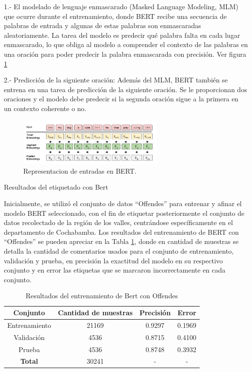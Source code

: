 1.- El modelado de lenguaje enmascarado (Masked Language Modeling, MLM) que ocurre durante el entrenamiento, donde BERT recibe una secuencia de palabras de entrada y algunas de estas palabras son enmascaradas aleatoriamente. La tarea del modelo es predecir qué palabra falta en cada lugar enmascarado, lo que obliga al modelo a comprender el contexto de las palabras en una oración para poder predecir la palabra enmascarada con precisión. Ver figura \ref{fig:nlp8}

2.- Predicción de la siguiente oración: Además del MLM, BERT también se entrena en una tarea de predicción de la siguiente oración. Se le proporcionan dos oraciones y el modelo debe predecir si la segunda oración sigue a la primera en un contexto coherente o no.

\begin{figure}
	\includegraphics[width=0.65\textwidth]{capitulo3/figuras/nlp8.png}
	\caption{Representacion de entradas en BERT.}
	\label{fig:nlp8}
\end{figure}

 Resultados del etiquetado con Bert

Inicialmente, se utilizó el conjunto de datos ``Offendes'' para entrenar y afinar  el modelo BERT seleccionado, con el fin de etiquetar posteriormente el conjunto de datos recolectado de la región de los valles, centrándose específicamente en el departamento de Cochabamba. Los resultados del entrenamiento de BERT con ``Offendes'' se pueden apreciar en la Tabla \ref{tbl:bert}, donde en cantidad de muestras se detalla la cantidad de comentarios usados para el conjunto de entrenamiento, validación y prueba, en precisión la exactitud del modelo en su respectivo conjunto y en error las etiquetas que se marcaron incorrectamente en cada conjunto.

\begin{table}[!ht]
	\centering
	\begin{tabular}{|c|c|c|c|}
		\hline
		\textbf{Conjunto} & \textbf{Cantidad de muestras} & \textbf{Precisión} & \textbf{Error} \\ \hline
		Entrenamiento & 21169 & 0.9297 & 0.1969 \\ 
		Validación & 4536 & 0.8715 & 0.4100 \\ 
		Prueba & 4536 & 0.8748 & 0.3932 \\ \hline
		\textbf{Total} & 30241 & - & - \\ \hline
	\end{tabular}
	\caption{Resultados del entrenamiento de Bert con Offendes}
	\label{tbl:bert}
\end{table}


